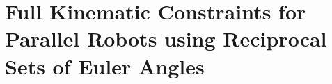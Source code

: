 \documentclass[robotics,article,submit,moreauthors,pdftex]{Definitions/mdpi}
\begin{document}
\section{Full Kinematic Constraints for Parallel Robots using Reciprocal Sets of Euler Angles}
\label{sec:ZB_PKM}
\end{document}

